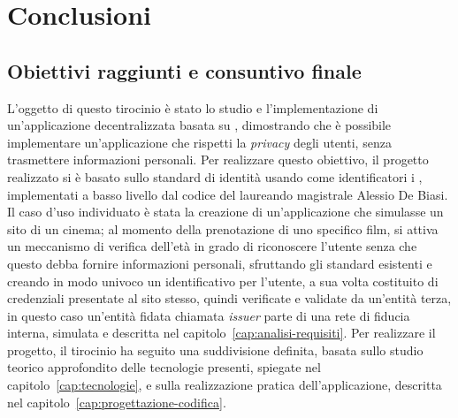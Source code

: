 \chapter{Conclusioni}\label{cap:conclusioni}


\section{Obiettivi raggiunti e consuntivo finale}\label{sec:conclusioni-obiettivi-consuntivo}

L'oggetto di questo tirocinio è stato lo studio e l'implementazione di un'applicazione decentralizzata basata su  , dimostrando che è possibile implementare un'applicazione che rispetti la \textit{privacy} degli utenti, senza trasmettere informazioni personali. 
Per realizzare questo obiettivo, il progetto realizzato si è basato sullo standard di identità  usando come identificatori i , implementati a basso livello dal codice del laureando magistrale Alessio De Biasi. \\

Il caso d'uso individuato è stata la creazione di un'applicazione che simulasse un sito di un cinema; al momento della prenotazione di uno specifico film, si attiva un meccanismo di verifica dell'età in grado di riconoscere l'utente senza che questo debba fornire informazioni personali,
sfruttando gli standard esistenti e creando in modo univoco un identificativo per l'utente, a sua volta costituito di credenziali presentate al sito stesso, quindi verificate e validate da un'entità terza, in questo caso un'entità fidata chiamata \textit{issuer} parte di una rete di fiducia interna,
simulata e descritta nel capitolo~\ref{cap:analisi-requisiti}.
Per realizzare il progetto, il tirocinio ha seguito una suddivisione definita, basata sullo studio teorico approfondito delle tecnologie presenti, spiegate nel capitolo~\ref{cap:tecnologie}, e sulla realizzazione pratica dell'applicazione, descritta nel capitolo~\ref{cap:progettazione-codifica}. \\

